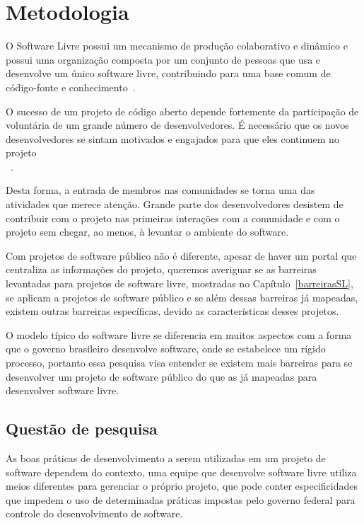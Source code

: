 \chapter{Metodologia}
\label{metodologia}

O Software Livre possui um mecanismo de produção colaborativo e dinâmico 
e possui uma organização composta por um conjunto de pessoas que usa e desenvolve 
um único software livre, contribuindo para uma base comum de código-fonte e 
conhecimento~\cite{reis2003caracterizacc}.

O sucesso de um projeto de código aberto depende fortemente da participação de 
voluntária de um grande número de desenvolvedores. É necessário que os novos 
desenvolvedores se sintam motivados e engajados para que eles continuem no 
projeto\\~\cite{qureshi2010socialization}.

Desta forma, a entrada de membros nas comunidades se torna uma das atividades que
merece atenção. Grande parte dos desenvolvedores desistem de contribuir com o 
projeto nas primeiras interações com a comunidade e com o projeto sem chegar,
ao menos, à levantar o ambiente do software.

Com projetos de software público não é diferente, apesar de haver um portal que
centraliza as informações do projeto, queremos averiguar se as barreiras levantadas
para projetos de software livre, mostradas no Capítulo~\ref{barreirasSL}, se aplicam
a projetos de software público e se além dessas barreiras já mapeadas, existem outras 
barreiras específicas, devido as características desses projetos.

O modelo típico do software livre se diferencia em muitos aspectos 
com a forma que o governo brasileiro desenvolve software, onde se estabelece um 
rígido processo, portanto essa pesquisa visa entender se existem mais barreiras 
para se desenvolver um projeto de software público do que as já mapeadas para 
desenvolver software livre.



\section{Questão de pesquisa}

As boas práticas de desenvolvimento a serem utilizadas em um projeto de software 
dependem do contexto, uma equipe que desenvolve software livre utiliza
meios diferentes para gerenciar o próprio projeto, que pode conter especificidades 
que impedem o uso de determinadas práticas impostas pelo governo federal para controle
do desenvolvimento de software. 

